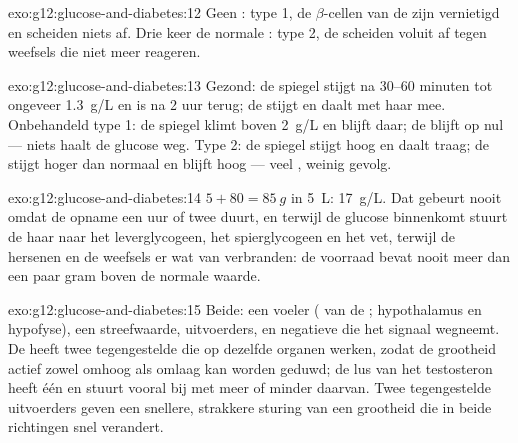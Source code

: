 \begin{solution}{exo:g12:glucose-and-diabetes:12}
Geen : type 1, de $\beta$-cellen van de  zijn vernietigd
en scheiden niets af. Drie keer de normale : type 2, de 
scheiden voluit af tegen weefsels die niet meer reageren.
\end{solution}

\begin{solution}{exo:g12:glucose-and-diabetes:13}
Gezond: de spiegel stijgt na 30--60 minuten tot ongeveer \qty{1.3}{g/L} en
is na 2 uur terug; de  stijgt en daalt met haar mee. Onbehandeld
type 1: de spiegel klimt boven \qty{2}{g/L} en blijft daar; de 
blijft op nul --- niets haalt de glucose weg. Type 2: de spiegel stijgt
hoog en daalt traag; de  stijgt hoger dan normaal en blijft hoog
--- veel , weinig gevolg.
\end{solution}

\begin{solution}{exo:g12:glucose-and-diabetes:14}
$5 + 80 = \qty{85}{g}$ in \qty{5}{L}: \qty{17}{g/L}. Dat gebeurt nooit
omdat de opname een uur of twee duurt, en terwijl de glucose binnenkomt
stuurt de  haar naar het leverglycogeen, het spierglycogeen en het
vet, terwijl de hersenen en de weefsels er wat van verbranden: de voorraad
bevat nooit meer dan een paar gram boven de normale waarde.
\end{solution}

\begin{solution}{exo:g12:glucose-and-diabetes:15}
Beide: een voeler ( van de ; hypothalamus en hypofyse), een
streefwaarde, uitvoerders, en negatieve  die het signaal
wegneemt. De  heeft twee tegengestelde  die op
dezelfde organen werken, zodat de grootheid actief zowel omhoog als omlaag
kan worden geduwd; de lus van het testosteron heeft één  en stuurt
vooral bij met meer of minder daarvan. Twee tegengestelde uitvoerders
geven een snellere, strakkere sturing van een grootheid die in beide
richtingen snel verandert.
\end{solution}

